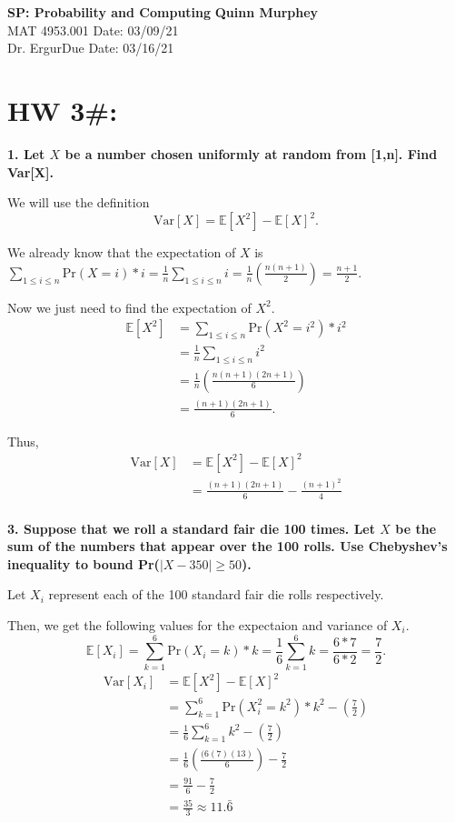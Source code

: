 \documentclass[letterpaper, 12pt]{article}
\newcommand{\E}{ \mathbb{E} }
\newcommand{\Var}{ \text{Var} }
\newcommand{\Pr}{ \text{Pr} }
\begin{document}
\noindent
\large\textbf{SP: Probability and Computing} \hfill \textbf{Quinn Murphey} \\
\normalsize MAT 4953.001 \hfill Date: 03/09/21\\
Dr. Ergur\hfill Due Date: 03/16/21\\
\noindent\makebox[\linewidth]{\rule{\paperwidth}{0.4pt}}


\section*{HW 3\#:}
\noindent\textbf{1. Let $X$ be a number chosen uniformly at random from [1,n]. Find Var[X].}

We will use the definition
$$\Var[X] = \E[X^2] - \E[X]^2.$$

We already know that the expectation of $X$ is $\sum_{1 \leq i \leq n} \Pr(X=i)*i = \frac{1}{n}\sum_{1 \leq i \leq n} i = \frac{1}{n}(\frac{n(n+1)}{2}) = \frac{n+1}{2}.$

Now we just need to find the expectation of $X^2$.
\begin{align*}
    \E[X^2] &= \sum_{1 \leq i \leq n} \Pr(X^2 = i^2)*i^2 \\
            &= \frac{1}{n}\sum_{1 \leq i \leq n} i^2 \\
            &= \frac{1}{n} (\frac{n(n+1)(2n+1)}{6}) \\
            &= \frac{(n+1)(2n+1)}{6}.
\end{align*}

Thus,
\begin{align*}
    \Var[X] &= \E[X^2] - \E[X]^2 \\
            &= \frac{(n+1)(2n+1)}{6} - \frac{(n+1)^2}{4} \\
\end{align*}

\noindent\textbf{3. Suppose that we roll a standard fair die 100 times. Let $X$ be the sum of the numbers that appear over the 100 rolls. Use Chebyshev's inequality to bound Pr($|X - 350| \geq 50$).}

Let $X_i$ represent each of the 100 standard fair die rolls respectively.

Then, we get the following values for the expectaion and variance of $X_i$.
$$\E[X_i] = \sum_{k=1}^6 \Pr(X_i = k) * k = \frac{1}{6}\sum_{k=1}^6 k = \frac{6*7}{6*2} = \frac{7}{2}.$$
\begin{align*}
    \Var[X_i] &= \E[X^2] - \E[X]^2 \\
              &= \sum_{k=1}^6 \Pr(X_i^2 = k^2) * k^2 - (\frac{7}{2}) \\
              &= \frac{1}{6}\sum_{k=1}^6  k^2 - (\frac{7}{2}) \\
              &= \frac{1}{6} (\frac{(6(7)(13)}{6}) - \frac{7}{2} \\
              &= \frac{91}{6} - \frac{7}{2} \\
              &= \frac{35}{3} \approx 11.\bar{6}
\end{align*}
\end{document}
